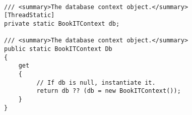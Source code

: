 \begin{lstlisting}[caption=Trådsikkerhed i tilgang til databasen, label=Code-ThreadStatic]

/// <summary>The database context object.</summary>
[ThreadStatic]
private static BookITContext db;

/// <summary>The database context object.</summary>
public static BookITContext Db
{
    get
    {
         // If db is null, instantiate it.
         return db ?? (db = new BookITContext());
    }
}
\end{lstlisting}